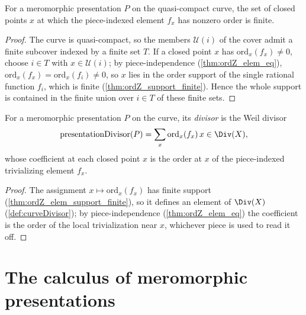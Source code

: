 \begin{theorem}
  \label{thm:ordZ_elem_support_finite}
  \leanok
  For a meromorphic presentation \(P\) on the quasi-compact curve, the set of closed points \(x\)
  at which the piece-indexed element \(f_x\) has nonzero order is finite.
\end{theorem}
\begin{proof}
  \leanok
  The curve is quasi-compact, so the members \(\mathcal U(i)\) of the cover admit a finite
  subcover indexed by a finite set \(T\). If a closed point \(x\) has \(\mathrm{ord}_x(f_x) \neq
  0\), choose \(i \in T\) with \(x \in \mathcal U(i)\); by piece-independence
  (\ref{thm:ordZ_elem_eq}), \(\mathrm{ord}_x(f_x) = \mathrm{ord}_x(f_i) \neq 0\), so \(x\) lies in
  the order support of the single rational function \(f_i\), which is finite
  (\ref{thm:ordZ_support_finite}). Hence the whole support is contained in the finite union over
  \(i \in T\) of these finite sets.
\end{proof}

\begin{definition}
  \label{def:presentationDivisor}
  \leanok
  For a meromorphic presentation \(P\) on the curve, its \emph{divisor} is the Weil divisor
  \[
    \mathrm{presentationDivisor}(P) = \sum_x \mathrm{ord}_x(f_x)\, x \in \Div(X),
  \]
  whose coefficient at each closed point \(x\) is the order at \(x\) of the piece-indexed
  trivializing element \(f_x\).
\end{definition}
\begin{proof}
  \leanok
  The assignment \(x \mapsto \mathrm{ord}_x(f_x)\) has finite support
  (\ref{thm:ordZ_elem_support_finite}), so it defines an element of \(\Div(X)\)
  (\ref{def:curveDivisor}); by piece-independence (\ref{thm:ordZ_elem_eq}) the coefficient is the
  order of the local trivialization near \(x\), whichever piece is used to read it off.
\end{proof}

\section{The calculus of meromorphic presentations}

